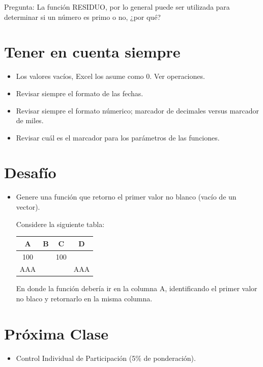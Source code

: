 \documentclass[12 pt,letterpaper]{article}
\begin{document}
\noindent
{\Huge\faComment} Pregunta: La función RESIDUO, por lo general puede ser utilizada para determinar si un número es primo o no, ¿por qué?

\section{Tener en cuenta siempre}

\begin{itemize}
	\item Los valores vacíos, Excel los asume como 0. Ver operaciones. 
	\item Revisar siempre el formato de las fechas.
	\item Revisar siempre el formato númerico; marcador de decimales versus marcador de miles. 
	\item Revisar cuál es el marcador para los parámetros de las funciones. 
\end{itemize}

\section{Desafío \faWarning}

\begin{itemize}
	\item Genere una función que retorno el primer valor no blanco (vacío de un vector). 
	
	Considere la siguiente tabla:
	
	\begin{center}
	\begin{tabular}{|c|c|c|c|}
		\hline
		A & B & C & D \\
		\hline
		100 &  & 100 &  \\
		\hline
		AAA &  &  & AAA \\
		\hline
	\end{tabular}
	\end{center}
	
	En donde la función debería ir en la columna A, identificando el primer valor no blaco y retornarlo en la misma columna. 
	
\end{itemize}

\section{Próxima Clase}

\begin{itemize}
	\item Control Individual de Participación (5\% de ponderación).
\end{itemize}
\end{document}
